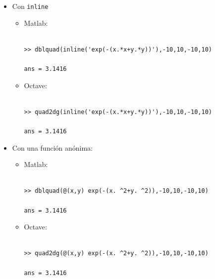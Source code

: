 \begin{itemize}
\item Con \texttt{inline}


  \begin{itemize}
  \item Matlab:\\
    \\
    \begin{minipage}[c]{1\textwidth}%

\begin{verbatim}
>> dblquad(inline('exp(-(x.*x+y.*y))'),-10,10,-10,10)

ans = 3.1416

\end{verbatim}
    \end{minipage}%

  \item Octave:\\
    \\
    \begin{minipage}[c]{1\textwidth}%

\begin{verbatim}
>> quad2dg(inline('exp(-(x.*x+y.*y))'),-10,10,-10,10)

ans = 3.1416

\end{verbatim}
    \end{minipage}%

  \end{itemize}
\item Con una función anónima:

  \begin{itemize}
  \item Matlab:\\
    \\
    \begin{minipage}[c]{1\linewidth}%

  \begin{verbatim}
>> dblquad(@(x,y) exp(-(x. ^2+y. ^2)),-10,10,-10,10)

ans = 3.1416

\end{verbatim}
\end{minipage}%

\item Octave:\\
\\
\begin{minipage}[c]{1\linewidth}%

\begin{verbatim}
>> quad2dg(@(x,y) exp(-(x. ^2+y. ^2)),-10,10,-10,10)

ans = 3.1416

\end{verbatim}
\end{minipage}

\end{itemize}
\end{itemize}



